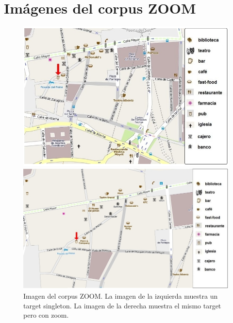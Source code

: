 \chapter{Im\'agenes del corpus ZOOM}
\label{imagenes-zoom}
\begin{figure}
\begin{minipage}[ht]{0.48\linewidth}
\centering
\includegraphics[width=\textwidth]{images/corpus/mapa3.png}
\caption{}
\label{mapa1}
\end{minipage}
\hspace*{0cm}
\begin{minipage}[ht]{0.55\linewidth}
\centering
\includegraphics[width=\textwidth]{images/corpus/mapa13.png}
\caption{}
\label{mapa2}
\end{minipage}
\caption{Imagen del corpus ZOOM. La imagen de la izquierda muestra un target singleton. La imagen de la derecha muestra el mismo target pero con zoom.}
\end{figure}

